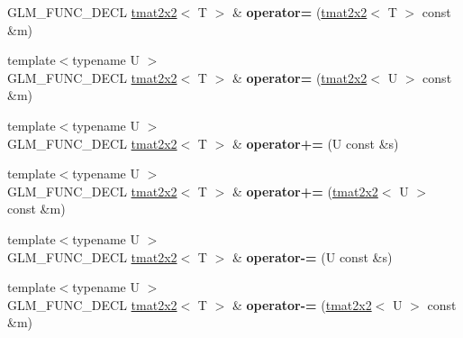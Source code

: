 \begin{DoxyCompactItemize}
\item 
\hypertarget{structglm_1_1detail_1_1tmat2x2_a9df009dce8bbc63128b7c75f8f3a64f4}{\-G\-L\-M\-\_\-\-F\-U\-N\-C\-\_\-\-D\-E\-C\-L \hyperlink{structglm_1_1detail_1_1tmat2x2}{tmat2x2}$<$ \-T $>$ \& {\bfseries operator=} (\hyperlink{structglm_1_1detail_1_1tmat2x2}{tmat2x2}$<$ \-T $>$ const \&m)}\label{structglm_1_1detail_1_1tmat2x2_a9df009dce8bbc63128b7c75f8f3a64f4}

\item 
\hypertarget{structglm_1_1detail_1_1tmat2x2_a274049fb0ef3138bdd7544fbb6f1b534}{{\footnotesize template$<$typename U $>$ }\\\-G\-L\-M\-\_\-\-F\-U\-N\-C\-\_\-\-D\-E\-C\-L \hyperlink{structglm_1_1detail_1_1tmat2x2}{tmat2x2}$<$ \-T $>$ \& {\bfseries operator=} (\hyperlink{structglm_1_1detail_1_1tmat2x2}{tmat2x2}$<$ \-U $>$ const \&m)}\label{structglm_1_1detail_1_1tmat2x2_a274049fb0ef3138bdd7544fbb6f1b534}

\item 
\hypertarget{structglm_1_1detail_1_1tmat2x2_a64b814c21f4373e2e26aa072fff81444}{{\footnotesize template$<$typename U $>$ }\\\-G\-L\-M\-\_\-\-F\-U\-N\-C\-\_\-\-D\-E\-C\-L \hyperlink{structglm_1_1detail_1_1tmat2x2}{tmat2x2}$<$ \-T $>$ \& {\bfseries operator+=} (\-U const \&s)}\label{structglm_1_1detail_1_1tmat2x2_a64b814c21f4373e2e26aa072fff81444}

\item 
\hypertarget{structglm_1_1detail_1_1tmat2x2_a509cf32a1cf5dc6841b13e927ab9a783}{{\footnotesize template$<$typename U $>$ }\\\-G\-L\-M\-\_\-\-F\-U\-N\-C\-\_\-\-D\-E\-C\-L \hyperlink{structglm_1_1detail_1_1tmat2x2}{tmat2x2}$<$ \-T $>$ \& {\bfseries operator+=} (\hyperlink{structglm_1_1detail_1_1tmat2x2}{tmat2x2}$<$ \-U $>$ const \&m)}\label{structglm_1_1detail_1_1tmat2x2_a509cf32a1cf5dc6841b13e927ab9a783}

\item 
\hypertarget{structglm_1_1detail_1_1tmat2x2_a436d6e8efe4575768e964fd87f3cdf8e}{{\footnotesize template$<$typename U $>$ }\\\-G\-L\-M\-\_\-\-F\-U\-N\-C\-\_\-\-D\-E\-C\-L \hyperlink{structglm_1_1detail_1_1tmat2x2}{tmat2x2}$<$ \-T $>$ \& {\bfseries operator-\/=} (\-U const \&s)}\label{structglm_1_1detail_1_1tmat2x2_a436d6e8efe4575768e964fd87f3cdf8e}

\item 
\hypertarget{structglm_1_1detail_1_1tmat2x2_a1988fa711e561a23f09f1a9a4e9982b1}{{\footnotesize template$<$typename U $>$ }\\\-G\-L\-M\-\_\-\-F\-U\-N\-C\-\_\-\-D\-E\-C\-L \hyperlink{structglm_1_1detail_1_1tmat2x2}{tmat2x2}$<$ \-T $>$ \& {\bfseries operator-\/=} (\hyperlink{structglm_1_1detail_1_1tmat2x2}{tmat2x2}$<$ \-U $>$ const \&m)}\label{structglm_1_1detail_1_1tmat2x2_a1988fa711e561a23f09f1a9a4e9982b1}


\end{DoxyCompactItemize}
